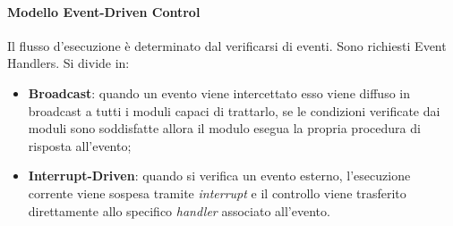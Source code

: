 \documentclass[12pt]{extarticle}
\begin{document}
\paragraph{Modello Event-Driven Control} Il flusso d'esecuzione è determinato dal verificarsi di eventi. Sono richiesti Event Handlers. Si divide in:
\begin{itemize}
    \item \textbf{Broadcast}: quando un evento viene intercettato esso viene diffuso in broadcast a tutti i moduli capaci di trattarlo, se le condizioni verificate dai moduli sono soddisfatte allora il modulo esegua la propria procedura di risposta all'evento;
    \item \textbf{Interrupt-Driven}: quando si verifica un evento esterno, l'esecuzione corrente viene sospesa tramite \textit{interrupt} e il controllo viene trasferito direttamente allo specifico \textit{handler} associato all'evento.
\end{itemize}
\end{document}
